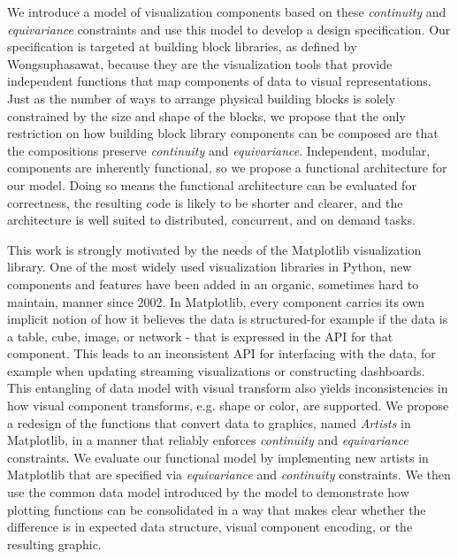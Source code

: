 \documentclass[../main.tex]{subfiles}
\begin{document}
We introduce a model of visualization components based on these \textit{continuity} and \textit{equivariance} constraints and use this model to develop a design specification. Our specification is targeted at building block libraries, as defined by Wongsuphasawat\cite{wongsuphasawatNavigatingWideWorld2021}, because they are the visualization tools that provide independent functions that map components of data to visual representations.  Just as the number of ways to arrange physical building blocks is solely constrained by the size and shape of the blocks, we propose that the only restriction on how building block library components can be composed are that the compositions preserve \textit{continuity} and \textit{equivariance}. Independent, modular, components are inherently functional\cite{hughesWhyFunctionalProgramming1989}, so we propose a functional architecture for our model. Doing so means the functional architecture can be evaluated for correctness, the resulting code is likely to be shorter and clearer, and the architecture is well suited to distributed, concurrent, and on demand tasks\cite{huHowFunctionalProgramming2015}.

This work is strongly motivated by the needs of the Matplotlib\cite{hunterMatplotlib2DGraphics2007,hunterArchitectureOpenSource} visualization library. One of the most widely used visualization libraries in Python, new components and features have been added in an organic, sometimes hard to maintain, manner since 2002.  In Matplotlib, every component carries its own implicit notion of how it believes the data is structured-for example if the data is a table, cube, image, or network - that is expressed in the API for that component. This leads to an inconsistent API for interfacing with the data, for example when  updating streaming visualizations or constructing dashboards\cite{a.sarikayaWhatWeTalk2019}. This entangling of data model with visual transform also yields inconsistencies in how visual component transforms, e.g. shape or color, are supported. We propose a redesign of the functions that convert data to graphics, named \textit{Artists} in Matplotlib, in a manner that reliably enforces \textit{continuity} and \textit{equivariance} constraints. We evaluate our functional model by implementing new artists in Matplotlib that are specified via \textit{equivariance} and \textit{continuity} constraints. We then use the common data model introduced by the model to demonstrate how plotting functions can be consolidated in a way that makes clear whether the difference is in expected data structure, visual component encoding, or the resulting graphic.
\end{document}
